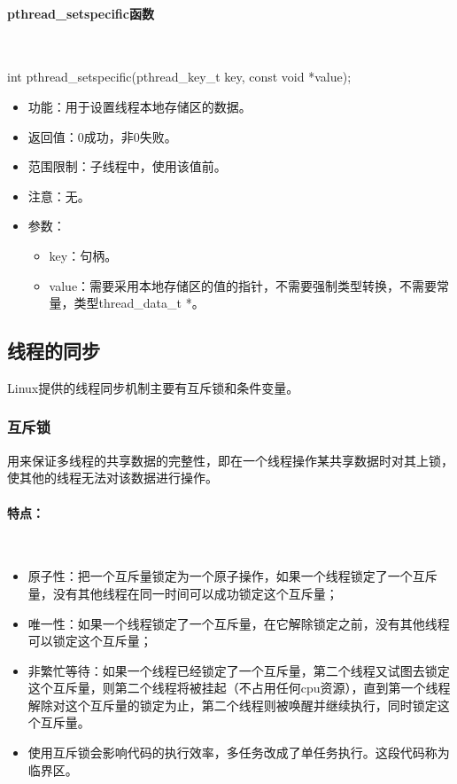 \documentclass[UTF8]{article}%
\begin{document}
\paragraph{pthread\_setspecific函数}~{}

int pthread\_setspecific(pthread\_key\_t key, const void *value);

\begin{itemize}
    \item 功能：用于设置线程本地存储区的数据。
    \item 返回值：0成功，非0失败。
    \item 范围限制：子线程中，使用该值前。
    \item 注意：无。
    \item 参数：
    {
        \begin{itemize}
            \item key：句柄。
            \item value：需要采用本地存储区的值的指针，不需要强制类型转换，不需要常量，类型thread\_data\_t *。
        \end{itemize}
    }
\end{itemize}

\subsection{线程的同步}

Linux提供的线程同步机制主要有互斥锁和条件变量。

\subsubsection{互斥锁}

用来保证多线程的共享数据的完整性，即在一个线程操作某共享数据时对其上锁，使其他的线程无法对该数据进行操作。

\paragraph{特点：}~{}
\begin{itemize}
    \item 原子性：把一个互斥量锁定为一个原子操作，如果一个线程锁定了一个互斥量，没有其他线程在同一时间可以成功锁定这个互斥量；
    \item 唯一性：如果一个线程锁定了一个互斥量，在它解除锁定之前，没有其他线程可以锁定这个互斥量；
    \item 非繁忙等待：如果一个线程已经锁定了一个互斥量，第二个线程又试图去锁定这个互斥量，则第二个线程将被挂起（不占用任何cpu资源），直到第一个线程解除对这个互斥量的锁定为止，第二个线程则被唤醒并继续执行，同时锁定这个互斥量。
    \item 使用互斥锁会影响代码的执行效率，多任务改成了单任务执行。这段代码称为临界区。
\end{itemize}
\end{document}
